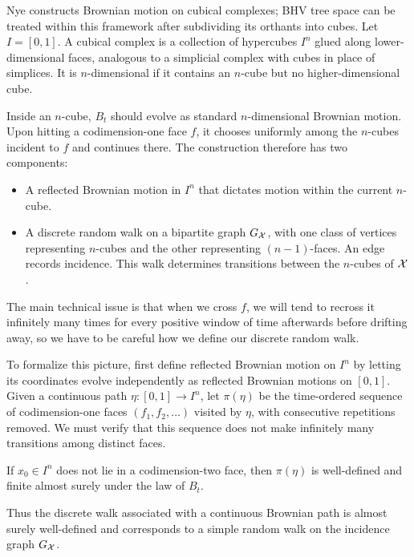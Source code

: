 Nye \cite{nye2019_brownian_motion_cubical_complexes} constructs Brownian motion
on cubical complexes; BHV tree space can be treated within this framework after
subdividing its orthants into cubes. Let $I=[0,1]$. A cubical complex is a
collection of hypercubes $I^n$ glued along lower-dimensional faces, analogous
to a simplicial complex with cubes in place of simplices. It is
$n$-dimensional if it contains an $n$-cube but no higher-dimensional cube.

Inside an $n$-cube, $B_t$ should evolve as standard $n$-dimensional Brownian
motion. Upon hitting a codimension-one face $f$, it chooses uniformly among the
$n$-cubes incident to $f$ and continues there. The construction therefore has
two components:

\begin{itemize}
    \item A reflected Brownian motion in $I^n$ that dictates motion within the
    current $n$-cube.

    \item A discrete random walk on a bipartite graph $G_{\mathcal X}$, with one class
    of vertices representing $n$-cubes and the other representing
    $(n-1)$-faces. An edge records incidence. This walk determines transitions
    between the $n$-cubes of ${\mathcal X}$.
\end{itemize}

The main technical issue is that when we cross $f$, we will tend to recross it infinitely many times for every positive window of time afterwards before drifting away, so we have to be careful how we define our discrete random walk.  

To formalize this picture, first define reflected Brownian motion on $I^n$ by
letting its coordinates evolve independently as reflected Brownian motions on
$[0,1]$. Given a continuous path $\eta:[0,1]\to I^n$, let $\pi(\eta)$ be the
time-ordered sequence of codimension-one faces $(f_1,f_2,\ldots)$ visited by
$\eta$, with consecutive repetitions removed. We must verify that this sequence
does not make infinitely many transitions among distinct faces.

 \begin{lem}
     If $x_0\in I^n$ does not lie in a codimension-two face, then
     $\pi(\eta)$ is well-defined and finite almost surely under the law of
     $B_t$.
 \end{lem}

 \noindent Thus the discrete walk associated with a continuous Brownian path is
 almost surely well-defined and corresponds to a simple random walk on the
 incidence graph $G_{\mathcal X}$.

